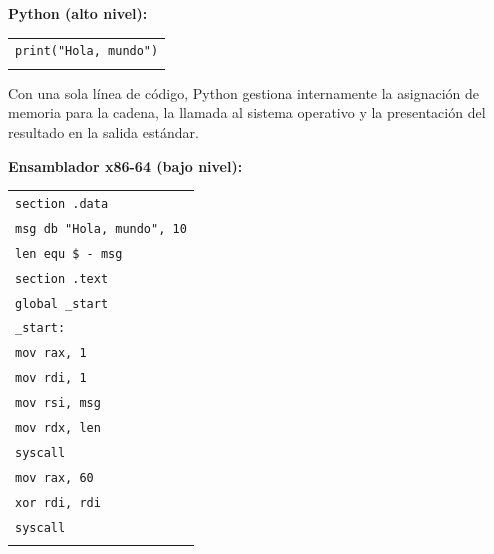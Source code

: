 \documentclass[12pt,a4paper]{article}
\begin{document}
	\textbf{Python (alto nivel):}
	
	\begin{center}
		\singlespacing
		\begin{tabular}{|p{13cm}|}
			\hline
			\vspace{0.1cm}
			\texttt{print("Hola, mundo")} \\
			\vspace{0.1cm} \\
			\hline
		\end{tabular}
	\end{center}
	
	\doublespacing
	
	Con una sola línea de código, Python gestiona internamente la asignación de memoria para la cadena, la llamada al sistema operativo y la presentación del resultado en la salida estándar.
	
	\textbf{Ensamblador x86-64 (bajo nivel):}
	
	\begin{center}
		\singlespacing
		\begin{tabular}{|p{13cm}|}
			\hline
			\vspace{0.1cm}
			\texttt{section .data} \\
			\texttt{\hspace{1cm}msg db "Hola, mundo", 10} \\
			\texttt{\hspace{1cm}len equ \$ - msg} \\
			\texttt{section .text} \\
			\texttt{\hspace{1cm}global \_start} \\
			\texttt{\_start:} \\
			\texttt{\hspace{1cm}mov rax, 1} \\
			\texttt{\hspace{1cm}mov rdi, 1} \\
			\texttt{\hspace{1cm}mov rsi, msg} \\
			\texttt{\hspace{1cm}mov rdx, len} \\
			\texttt{\hspace{1cm}syscall} \\
			\texttt{\hspace{1cm}mov rax, 60} \\
			\texttt{\hspace{1cm}xor rdi, rdi} \\
			\texttt{\hspace{1cm}syscall} \\
			\vspace{0.1cm} \\
			\hline
		\end{tabular}
	\end{center}
	
\end{document}
